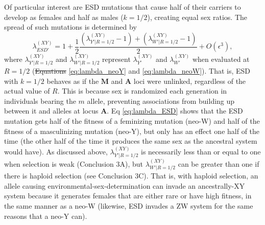 \documentclass[10pt,letterpaper]{article}
\providecommand{\DIFadd}[1]{{\protect\color{blue}\uwave{#1}}} %
\providecommand{\DIFdel}[1]{{\protect\color{red}\sout{#1}}}                      %
\providecommand{\DIFaddbegin}{} %
\providecommand{\DIFaddend}{} %
\providecommand{\DIFdelbegin}{} %
\providecommand{\DIFdelend}{} %
\begin{document}
\DIFdelend Of particular interest are ESD mutations that cause half of their carriers to develop as females and half as males ($k=1/2$), creating equal sex ratios.
The spread of such mutations is determined by
\begin{equation}
\lambda_{ESD'}^{(XY)} =1+ \frac{1}{2}\frac{(\lambda_{Y'\rvert R=1/2}^{(XY)}-1) + (\lambda_{W'\rvert R=1/2}^{(XY)}-1)}{2} + O\left(\epsilon^3\right),
\label{eq:lambda_ESD}
\end{equation}
\noindent
where $\lambda_{Y'\rvert R=1/2}^{(XY)}$ and $\lambda_{W'\rvert R=1/2}^{(XY)}$ represent $\lambda_{Y'}^{(XY)}$ and $\lambda_{W'}^{(XY)}$ when evaluated at $R=1/2$ (\DIFdelbegin \DIFdel{Equations }\DIFdelend \DIFaddbegin \DIFadd{Eqs }\DIFaddend \ref{eq:lambda_neoY} and \ref{eq:lambda_neoW}).
That is, ESD with $k=1/2$ behaves as if the $\mathbf{M}$ and $\mathbf{A}$ loci were unlinked, regardless of the actual value of $R$.
This is because sex is randomized each generation in individuals bearing the $m$ allele, preventing associations from building up between it and alleles at locus $\mathbf{A}$. 
Eq \eqref{eq:lambda_ESD} shows that the ESD mutation gets half of the fitness of a feminizing mutation (neo-W) and half of the fitness of a masculinizing mutation (neo-Y), but only has an effect one half of the time (the other half of the time it produces the same sex as the ancestral system would have). 
As discussed above, $\lambda_{Y'\rvert R=1/2}^{(XY)}$ is necessarily less than or equal to one when selection is weak (Conclusion 3A), but $\lambda_{W'\rvert R=1/2}^{(XY)}$ can be greater than one if there is haploid selection (see Conclusion 3C).
That is, with haploid selection, an allele causing environmental-sex-determination can invade an ancestrally-XY system because it generates females that are either rare or have high fitness, in the same manner as a neo-W (likewise, ESD invades a ZW system for the same reasons that a neo-Y can).
\end{document}
